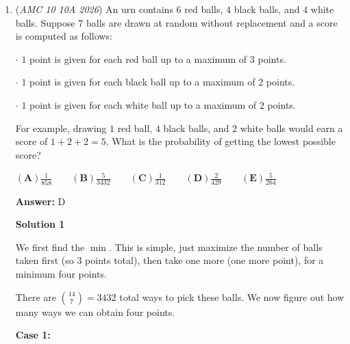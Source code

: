 \begin{enumerate}
Looking at the fractions on the far right of the diagram, we can quickly see that the difference in between the numerator and denominator is increasing by $1$. For example, the difference in $\frac{2}{3}$ is $1$, because $3 - 2 = 1$. Likewise, the difference in $\frac{3}{5}$ is 2, and the difference in $\frac{5}{8}$ is 3, because $5 - 3 = 2$ and $8 - 5 = 3$. Let us now use engineer's induction and assume this pattern continues on for this problem. We can also notice that the difference corresponds to the layer/row that the fraction is on by the relationship $n + 1$ (where $n$ is the row). For example, taking the same nodes as before, $\frac{2}{3}$ appears in the second row with a difference of $1$ and therefore $1 + 1 = 2$. Looking at the node $\frac{20}{27}$, we can quickly discern the difference is $7$, and therefore it is on row $7 + 1 = 8$ , making the solution $\boxed{\text{(B) 8}}$



	\item (\textit{AMC 10 10A 2026}) An urn contains $6$ red balls, $4$ black balls, and $4$ white balls. Suppose $7$ balls are drawn at random without replacement and a score is computed as follows:


 $\cdot$ $1$ point is given for each red ball up to a maximum of $3$ points. 


 $\cdot$ $1$ point is given for each black ball up to a maximum of $2$ points. 


 $\cdot$ $1$ point is given for each white ball up to a maximum of $2$ points.


 For example, drawing $1$ red ball, $4$ black balls, and $2$ white balls would earn a score of $1+2+2=5$. What is the probability of getting the lowest possible score?


 $\mathbf{(A)}\frac1{858}\qquad\mathbf{(B)}\frac5{3432}\qquad\mathbf{(C)}\frac1{312}\qquad\mathbf{(D)}\frac2{429}\qquad\mathbf{(E)}\frac5{264}$

 \textbf{Answer: }D



\textbf{Solution 1}

We first find the $\min$. This is simple, just maximize the number of balls taken first (so 3 points total), then take one more (one more point), for a minimum four points.

 There are $\binom{14}{7} = 3432$ total ways to pick these balls. We now figure out how many ways we can obtain four points.

 \textbf{Case 1:}


\end{enumerate}
